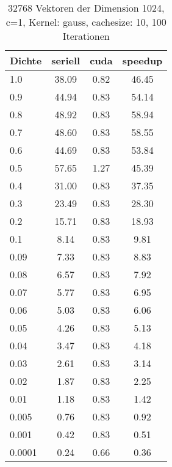 \documentclass[ngerman]{scrartcl}
\begin{document}




\begin{table}
\begin{center}
\begin{tabular}{|l|c|c|c|}
\hline
Dichte & seriell & cuda & speedup \\
\hline
1.0 & 38.09 & 0.82 & 46.45 \\
0.9 & 44.94 & 0.83 & 54.14 \\
0.8 & 48.92 & 0.83 & 58.94 \\
0.7 & 48.60 & 0.83 & 58.55 \\
0.6 & 44.69 & 0.83 & 53.84 \\
0.5 & 57.65 & 1.27 & 45.39 \\
0.4 & 31.00 & 0.83 & 37.35 \\
0.3 & 23.49 & 0.83 & 28.30 \\
0.2 & 15.71 & 0.83 & 18.93 \\
0.1 & 8.14 & 0.83 & 9.81 \\
0.09 & 7.33 & 0.83 & 8.83 \\
0.08 & 6.57 & 0.83 & 7.92 \\
0.07 & 5.77 & 0.83 & 6.95 \\
0.06 & 5.03 & 0.83 & 6.06 \\
0.05 & 4.26 & 0.83 & 5.13 \\
0.04 & 3.47 & 0.83 & 4.18 \\
0.03 & 2.61 & 0.83 & 3.14 \\
0.02 & 1.87 & 0.83 & 2.25 \\
0.01 & 1.18 & 0.83 & 1.42 \\
0.005 & 0.76 & 0.83 & 0.92 \\
0.001 & 0.42 & 0.83 & 0.51 \\
0.0001 & 0.24 & 0.66 & 0.36 \\
\hline
\end{tabular}
\end{center}
\caption{ 32768 Vektoren der Dimension 1024, c=1, Kernel: gauss, cachesize: 10, 100 Iterationen}
\label{tbl:density-gauss-10}
\end{table}
\end{document}
